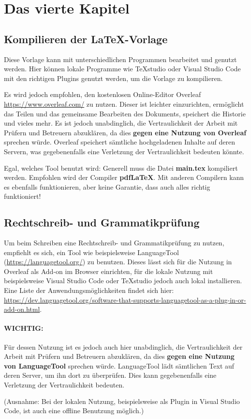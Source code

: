 \chapter{Das vierte Kapitel}

\section{Kompilieren der LaTeX-Vorlage}
Diese Vorlage kann mit unterschiedlichen Programmen bearbeitet und genutzt werden. Hier können lokale Programme wie TeXstudio oder Visual Studio Code mit den richtigen Plugins genutzt werden, um die Vorlage zu kompilieren.

Es wird jedoch empfohlen, den kostenlosen Online-Editor Overleaf \href{https://www.overleaf.com/}{https://www.overleaf.com/} zu nutzen. Dieser ist leichter einzurichten, ermöglicht das Teilen und das gemeinsame Bearbeiten des Dokuments, speichert die Historie und vieles mehr. Es ist jedoch unabdinglich, die Vertraulichkeit der Arbeit mit Prüfern und Betreuern abzuklären, da dies \textbf{gegen eine Nutzung von Overleaf} sprechen würde. Overleaf speichert sämtliche hochgeladenen Inhalte auf deren Servern, was gegebenenfalls eine Verletzung der Vertraulichkeit bedeuten könnte.

Egal, welches Tool benutzt wird: Generell muss die Datei \textbf{main.tex} kompiliert werden. Empfohlen wird der Compiler \textbf{pdfLaTeX}. Mit anderen Compilern kann es ebenfalls funktionieren, aber keine Garantie, dass auch alles richtig funktioniert!

\section{Rechtschreib- und Grammatikprüfung}
Um beim Schreiben eine Rechtschreib- und Grammatikprüfung zu nutzen, empfiehlt es sich, ein Tool wie beispielsweise LanguageTool (\href{https://languagetool.org/}{https://languagetool.org/}) zu benutzen. Dieses lässt sich für die Nutzung in Overleaf als Add-on im Browser einrichten, für die lokale Nutzung mit beispielsweise Visual Studio Code oder TeXstudio jedoch auch lokal installieren. Eine Liste der Anwendungsmöglichkeiten findet sich hier: \href{https://dev.languagetool.org/software-that-supports-languagetool-as-a-plug-in-or-add-on.html}{https://dev.languagetool.org/software-that-supports-languagetool-as-a-plug-in-or-add-on.html}.

\subsubsection{WICHTIG:}
Für dessen Nutzung ist es jedoch auch hier unabdinglich, die Vertraulichkeit der Arbeit mit Prüfern und Betreuern abzuklären, da dies \textbf{gegen eine Nutzung von LanguageTool} sprechen würde. LanguageTool lädt sämtlichen Text auf deren Server, um ihn dort zu überprüfen. Dies kann gegebenenfalls eine Verletzung der Vertraulichkeit bedeuten.

(Ausnahme: Bei der lokalen Nutzung, beispielsweise als Plugin in Visual Studio Code, ist auch eine offline Benutzung möglich.)